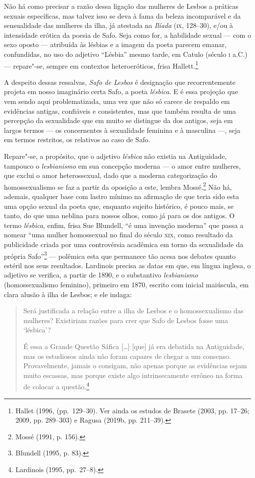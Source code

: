 Não há como precisar a razão dessa ligação das mulheres de Lesbos a práticas
sexuais específicas, mas talvez isso se deva à fama da beleza incomparável e da
sensualidade das mulheres da ilha, já atestada na \textit{Ilíada} (\textsc{ix}, 128--30),
e/ou à intensidade erótica da poesia de Safo. Seja como for, a habilidade
sexual --- com o sexo oposto --- atribuída às lésbias e a imagem da poeta parecem
emanar, confundidas, no uso do adjetivo “Lésbia” mesmo tarde, em Catulo
(século \textsc{i} a.C.) --- repare"-se, sempre em contextos heteroeróticos, frisa Hallett.\footnote{ Hallet 
(1996, (pp.~129--30). Ver ainda os estudos de Brasete (2003, pp. 17--26; 2009, pp. 289--303) e Ragusa (2019b, pp. 211--39).} 

A despeito dessas ressalvas, \textit{Safo de Lesbos} é designação que
recorrentemente projeta em nosso imaginário certa Safo, a poeta
\textit{lésbica}. E é essa projeção que vem sendo aqui
problematizada, uma vez que não só carece de respaldo em evidências antigas,
confiáveis e consistentes, mas que também resulta de uma percepção da
sexualidade que em muito se distingue da dos antigos, seja em largos termos ---
os concernentes à sexualidade feminina e à masculina ---, seja em termos
restritos, os relativos ao caso de Safo. 

Repare"-se, a propósito, que o adjetivo \textit{lésbica} não existia na
Antiguidade, tampouco o \textit{lesbianismo} em sua concepção moderna --- o amor
entre mulheres, que exclui o amor heterossexual, dado que a moderna
categorização do homossexualismo se faz a partir da oposição a este, lembra Mossé.\footnote{ Mossé (1991, p. 156).} Não há,
ademais, qualquer base com lastro mínimo na afirmação de que teria sido esta
uma opção sexual da poeta que, enquanto sujeito histórico, é pouco mais, se
tanto, do que uma neblina para nossos olhos, como já para os dos antigos. O
termo \textit{lésbica}, enfim, frisa Sue Blundell, “é uma
invenção moderna” que passa a nomear “uma mulher homossexual no final do século
\textsc{xix}, como resultado da publicidade criada por uma controvérsia acadêmica em
torno da sexualidade da própria Safo”\footnote{ Blundell (1995, p. 83).} --- polêmica esta que permanece tão acesa
nos debates quanto estéril nos seus resultados.
Lardinois precisa as datas em que, em
língua inglesa, o adjetivo se verifica, a partir de 1890, e o substantivo
\textit{lesbianismo} (homossexualismo feminino), primeiro em 1870, escrito com
inicial maiúscula, em clara alusão à ilha de Lesbos; e ele indaga:

\begin{quote}
Será justificada a relação entre a ilha de Lesbos e o homossexualismo das
mulheres? Existiriam razões para crer que Safo de Lesbos fosse uma ‘lésbica’?

É essa a Grande Questão Sáfica [\ldots{}] [que] já era debatida na Antiguidade, mas
os estudiosos ainda não foram capazes de chegar a um consenso. Provavelmente,
jamais o consigam, não apenas porque as evidências sejam muito escassas, mas
porque existe algo intrinsecamente errôneo na forma de colocar a questão.\footnote{ Lardinois (1995, pp.~27--8).}
\end{quote}

